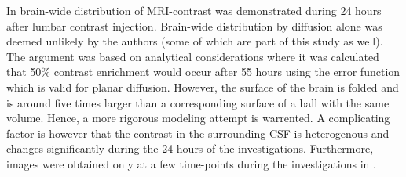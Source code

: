 \documentclass[11pt,a4paper]{article}
\newcommand{\kam}[1]{\textcolor{blue}{#1}}
\begin{document}

In \cite{ringstad2018brain} brain-wide distribution of MRI-contrast was demonstrated during 24 hours after lumbar contrast injection. Brain-wide distribution by diffusion alone was deemed unlikely by the authors (some of which are part 
of this study as well). The argument was based on analytical considerations where it was calculated that 50\% contrast enrichment would occur after 
55 hours using the error function which is valid for planar diffusion. However, 
the surface of the brain is folded and is around five times larger than 
a corresponding surface of a ball with the same volume. Hence, 
a more rigorous modeling attempt is warrented. A complicating factor
is however that the contrast in the surrounding CSF is heterogenous
and changes significantly during the 24 hours of the investigations. 
Furthermore, images were obtained only at a few time-points during the investigations in \cite{ringstad2018brain}.  
\end{document}
